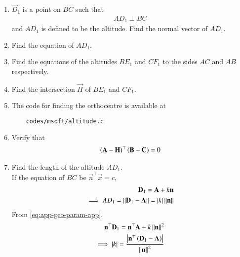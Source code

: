 \begin{enumerate}[label=\thesubsection.\arabic*.,ref=\thesubsection.\theenumi]
\item $\vec{D}_1$ is a point on $BC$ such that
		\begin{align}
			AD_1 \perp BC
		\end{align}
		and $AD_1$ is defined to be the altitude. 
		Find the normal vector of $AD_1$.
  \\
		
	\item Find the equation of $AD_1$.
 \\     

	\item Find the equations of the altitudes $BE_1$ and $CF_1$ to the sides $AC$ and $AB$ respectively. 
  \\     
	\item Find the intersection $\vec{H}$ of $BE_1$ and $CF_1$.
 \\
        
\item 
The code for finding the orthocentre is available at
\begin{lstlisting}
	codes/msoft/altitude.c
\end{lstlisting}
	\item Verify that 
		\begin{align}
			\left(\mathbf{A}-\mathbf{H}\right)^{\top}\left(\mathbf{B}-\mathbf{C}\right) = 0
		\end{align}
\iffalse
  
  \item Find the length of the altitude $AD_1$.
	  \\
		\solution 
		If the equation of $BC$ be $\vec{n}^\top\vec{x} =c$,
\begin{align}
			\label{eq:app-geo-param-app}
	\mathbf{D}_1 = \mathbf{A} + k\mathbf{n}
	\\
	\implies AD_1 = \left\lVert\mathbf{D}_1 - \mathbf{A}\right\rVert=\left\vert k\right\vert \left\lVert\mathbf{n}\right\rVert
			\label{eq:app-geo-param-app-PQ}
\end{align}
			From \eqref{eq:app-geo-param-app},
\begin{align}
	\vec{n}^{\top}  \vec{D}_1 = \vec{n}^{\top}  \vec{A} + k\norm{\vec{n}}^2
	\\
	\implies \abs{k} = 
	\frac{\abs{\vec{n}^{\top}\brak{\vec{D}_1 - \vec{A}}}}{\norm{\vec{n}}^2}
			\label{eq:app-geo-param-app-k}
			\\

\end{align}
\end{enumerate}
